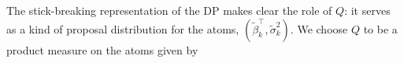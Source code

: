 The stick-breaking representation of the DP makes clear the role of $Q$: it serves as a kind of proposal distribution for the atoms, $\left(\tilde{\beta}_k^\top ,\tilde{\sigma}^2_k\right)$. We choose $Q$ to be a product measure on the atoms given by
% 
% 

